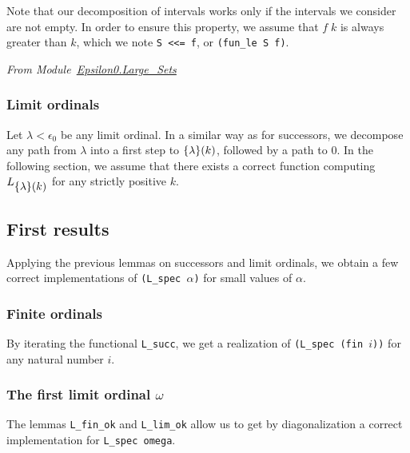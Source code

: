 Note that our decomposition of intervals works only if the intervals we consider are not empty. In order to ensure this property, we assume that $f\;k$ is always greater than $k$, which we note \texttt{S <<= f}, or \texttt{(fun\_le S f)}.



\emph{From Module~\href{../theories/html/hydras.Epsilon0.Large_Sets.html}{Epsilon0.Large\_Sets}}




\subsubsection{Limit ordinals}
\label{sect:L-spec-lim}

Let $\lambda<\epsilon_0$ be any limit ordinal. In a similar way as for successors, we decompose any path from $\lambda$  into a first step to
$\mbox{$\{\lambda\}(k)$}$, followed by a path to $0$. In the following section, we assume that there exists a correct function computing  $L_{\mbox{$\{\lambda\}(k)$}}$ for any strictly positive $k$.




\subsection{First results}

Applying the previous lemmas on successors and limit ordinals, 
we obtain a few  correct implementations of \texttt{(L\_spec $\alpha$)} for small values of $\alpha$.

\subsubsection{Finite ordinals}

By iterating the functional \texttt{L\_succ}, we get a realization of
\texttt{(L\_spec (fin $i$))} for any natural number $i$. 


\vspace{-16pt}


\subsubsection{The first limit ordinal  \texorpdfstring{$\omega$}{omega}}

The lemmas \texttt{L\_fin\_ok} and \texttt{L\_lim\_ok}   allow us to get 
by diagonalization a correct implementation for 
\texttt{L\_spec omega}.

